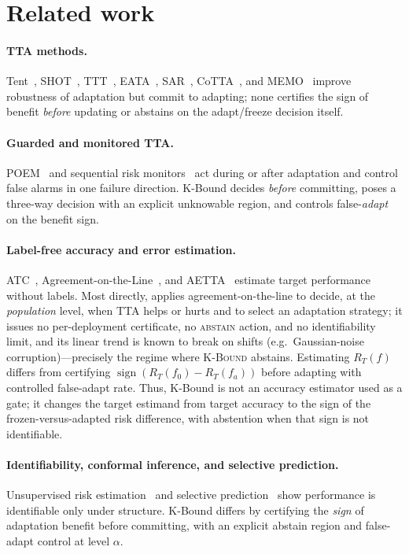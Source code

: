 \documentclass[conference]{IEEEtran}
\theoremstyle{plain}
\theoremstyle{definition}
\theoremstyle{remark}
\newcommand{\sign}{\operatorname{sign}}
\begin{document}
\section{Related work}
\paragraph{TTA methods.}
Tent~\cite{wang2021tent}, SHOT~\cite{liang2020shot}, TTT~\cite{sun2020ttt}, EATA~\cite{niu2022eata},
SAR~\cite{niu2023sar}, CoTTA~\cite{wang2022cotta}, and MEMO~\cite{zhang2022memo} improve
robustness of adaptation but commit to adapting; none certifies the sign of benefit
\emph{before} updating or abstains on the adapt/freeze decision itself.

\paragraph{Guarded and monitored TTA.}
POEM~\cite{bar2024poem} and sequential risk monitors~\cite{schirmer2025monitoring,podkopaev2022tracking}
act during or after adaptation and control false alarms in one failure direction.
K-Bound decides \emph{before} committing, poses a three-way decision with an explicit
unknowable region, and controls false-\emph{adapt} on the benefit sign.

\paragraph{Label-free accuracy and error estimation.}
ATC~\cite{garg2022atc}, Agreement-on-the-Line~\cite{baek2022aol,miller2021aol}, and
AETTA~\cite{lee2024aetta} estimate target performance without labels. Most directly,
\cite{kim2024taol} applies agreement-on-the-line to decide, at the \emph{population}
level, when TTA helps or hurts and to select an adaptation strategy; it issues no
per-deployment certificate, no \textsc{abstain} action, and no identifiability limit, and its
linear trend is known to break on shifts (e.g.\ Gaussian-noise corruption)---precisely the
regime where \textsc{K-Bound} abstains. Estimating
$R_T(f)$ differs from certifying $\sign(R_T(f_0)-R_T(f_a))$ before adapting with
controlled false-adapt rate. Thus, K-Bound is not an accuracy estimator used as a gate; it
changes the target estimand from target accuracy to the sign of the frozen-versus-adapted
risk difference, with abstention when that sign is not identifiable.

\paragraph{Identifiability, conformal inference, and selective prediction.}
Unsupervised risk estimation~\cite{steinhardt2016,bendavid2010theory,rosenfeld2023dis2}
and selective prediction~\cite{geifman2017selective} show performance is identifiable
only under structure. K-Bound differs by certifying the \emph{sign} of adaptation benefit
before committing, with an explicit abstain region and false-adapt control at level $\alpha$.
\end{document}
